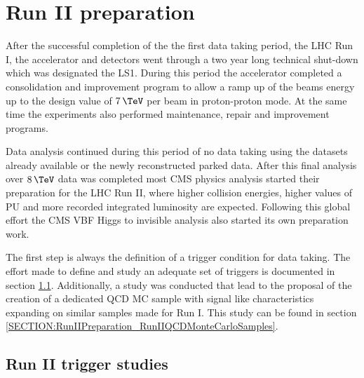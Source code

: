 \chapter{Run II preparation}
\label{CHAPTER:RunIIPreparation}



After the successful completion of the the first data taking period, the \gls{LHC} Run I, the accelerator and detectors went through a two year long technical shut-down which was designated the \gls{LS1}. During this period the accelerator completed a consolidation and improvement program to allow a ramp up of the beams energy up to the design value of $7\,\TeV$ per beam in proton-proton mode. At the same time the experiments also performed maintenance, repair and improvement programs. 

Data analysis continued during this period of no data taking using the datasets already available or the newly reconstructed parked data. After this final analysis over $8\,\TeV$ data was completed most \gls{CMS} physics analysis started their preparation for the \gls{LHC} Run II, where higher collision energies, higher values of \gls{PU} and more recorded integrated luminosity are expected. Following this global effort the \gls{CMS} \gls{VBF} Higgs to invisible analysis also started its own preparation work. 

The first step is always the definition of a trigger condition for data taking. The effort made to define and study an adequate set of triggers is documented in section \ref{SECTION:RunIITriggerStudies}. Additionally, a study was conducted that lead to the proposal of the creation of a dedicated \gls{QCD} \gls{MC} sample with signal like characteristics expanding on similar samples made for Run I. This study can be found in section \ref{SECTION:RunIIPreparation_RunIIQCDMonteCarloSamples}.

\section{Run II trigger studies}
\label{SECTION:RunIITriggerStudies}

% 
%

